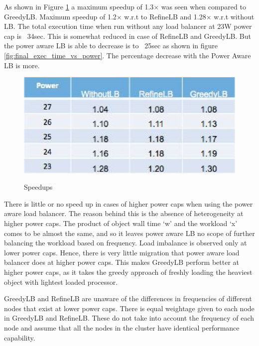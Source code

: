 As shown in Figure \ref{tb:1} a maximum speedup of 1.3$\times$ was seen when compared
to GreedyLB. Maximum speedup of 1.2$\times$ w.r.t to RefineLB and 1.28$\times$ w.r.t without LB.
The total execution time when run without any load balancer at 23W power cap is
~34sec.  This is somewhat reduced in case of RefineLB and GreedyLB. But the
power aware LB is able to decrease is to ~25sec as shown in figure
\ref{fig:final_exec_time_vs_power}. The percentage decrease with the Power
Aware LB is more.

\begin{figure}[htbp]
  \begin{center}
  \scalebox{.75} {
     \includegraphics[scale=0.8]{Jacobi/EPS/t2.eps} 
  }
     \end{center}
  \caption{Speedups}
  \label{tb:1}
\end{figure}

There is little or no speed up in cases of higher power caps when using the
power aware load balancer. The reason behind this is the absence of
heterogeneity at higher power caps. The product of object wall time ‘w’ and the
workload ‘x’ comes to be almost the same, and so it leaves power aware LB no
scope of further balancing the workload based on frequency. Load imbalance is
observed only at lower power caps. Hence, there is very little migration that
power aware load balancer does at higher power caps. This makes GreedyLB
perform better at higher power caps, as it takes the greedy approach of freshly
loading the heaviest object with lightest loaded processor. 

GreedyLB and RefineLB are unaware of the differences in frequencies of
different nodes that exist at lower power caps. There is equal weightage given
to each node in GreedyLB and RefineLB. These do not take into account the
frequency of each node and assume that all the nodes in the cluster have
identical performance capability.


